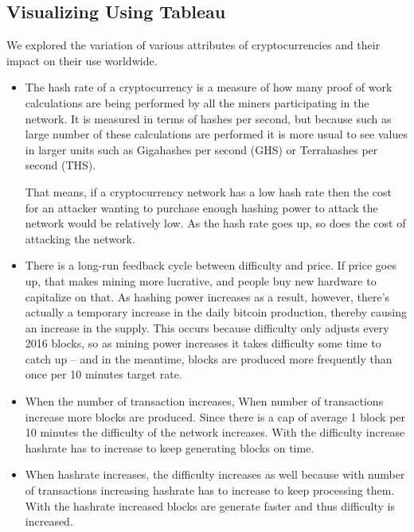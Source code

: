 \documentclass{article}
\begin{document}
\subsection {Visualizing Using Tableau}
We explored the variation of various attributes of cryptocurrencies and their impact on their use worldwide. 
\begin{itemize}

\item The hash rate of a cryptocurrency is a measure of how many proof of work calculations are being performed by all the miners participating in the network. It is measured in terms of hashes per second, but because such as large number of these calculations are performed it is more usual to see values in larger units such as Gigahashes per second (GHS) or Terrahashes per second (THS).

That means, if a cryptocurrency network has a low hash rate then the cost for an attacker wanting to purchase enough hashing power to attack the network would be relatively low. As the hash rate goes up, so does the cost of attacking the network.

\item There is a long-run feedback cycle between difficulty and price. If price goes up, that makes mining more lucrative, and people buy new hardware to capitalize on that. As hashing power increases as a result, however, there’s actually a temporary increase in the daily bitcoin production, thereby causing an increase in the supply. This occurs because difficulty only adjusts every 2016 blocks, so as mining power increases it takes difficulty some time to catch up – and in the meantime, blocks are produced more frequently than once per 10 minutes target rate.

\item When the number of transaction increases, When number of transactions increase more blocks are produced. Since there is a cap of average 1 block per 10 minutes the difficulty of the network increases. With the difficulty increase hashrate has to increase to keep generating blocks on time.

\item When hashrate increases, the difficulty increases as well because with number of transactions increasing hashrate has to increase to keep processing them. With the hashrate increased blocks are generate faster and thus difficulty is increased.

\end{itemize}
\end{document}
